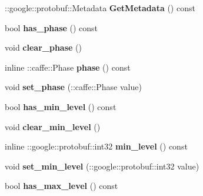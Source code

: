 \begin{DoxyCompactItemize}
\mbox{\label{classcaffe_1_1_net_state_rule_a6cc1e7142384f4768bdb370df6d46cf3}} 
\+::google\+::protobuf\+::\+Metadata {\bfseries Get\+Metadata} () const
\item 
\mbox{\label{classcaffe_1_1_net_state_rule_a05eac3b9c51afcddab9a4f6044cfb0d2}} 
bool {\bfseries has\+\_\+phase} () const
\item 
\mbox{\label{classcaffe_1_1_net_state_rule_adba1858c502a2ac63e747800de6a76fb}} 
void {\bfseries clear\+\_\+phase} ()
\item 
\mbox{\label{classcaffe_1_1_net_state_rule_a6f17fe2e26f1ba59100f445ee5c01e50}} 
inline \+::caffe\+::\+Phase {\bfseries phase} () const
\item 
\mbox{\label{classcaffe_1_1_net_state_rule_af6d1805f70654c431baa35eeadf70d79}} 
void {\bfseries set\+\_\+phase} (\+::caffe\+::\+Phase value)
\item 
\mbox{\label{classcaffe_1_1_net_state_rule_a52da8aa2c66b9eb67773ea50dd716240}} 
bool {\bfseries has\+\_\+min\+\_\+level} () const
\item 
\mbox{\label{classcaffe_1_1_net_state_rule_a99daec36c4dc057e0acc095bc0cf52d9}} 
void {\bfseries clear\+\_\+min\+\_\+level} ()
\item 
\mbox{\label{classcaffe_1_1_net_state_rule_ac35cda48f5ceb514d8a9a40abfaae909}} 
inline \+::google\+::protobuf\+::int32 {\bfseries min\+\_\+level} () const
\item 
\mbox{\label{classcaffe_1_1_net_state_rule_ae2bc06265734285e649e9dab4d94c329}} 
void {\bfseries set\+\_\+min\+\_\+level} (\+::google\+::protobuf\+::int32 value)
\item 
\mbox{\label{classcaffe_1_1_net_state_rule_a7efd5d3decc706fa64fd2ecacb53f46c}} 
bool {\bfseries has\+\_\+max\+\_\+level} () const
\item 

\end{DoxyCompactItemize}
